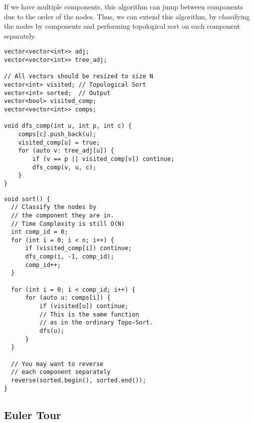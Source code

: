 If we have multiple components, this algorithm can jump
between components due to the order of the nodes. Thus, we can extend this algorithm, 
by classifying the nodes by components and performing topological sort on each component separately.

\begin{center}
\begin{minipage}[t]{0.45\linewidth}
\begin{lstlisting}
vector<vector<int>> adj;
vector<vector<int>> tree_adj;

// All vectors should be resized to size N
vector<int> visited; // Topological Sort
vector<int> sorted;  // Output
vector<bool> visited_comp;
vector<vector<int>> comps;

void dfs_comp(int u, int p, int c) {
    comps[c].push_back(u);
    visited_comp[u] = true;
    for (auto v: tree_adj[u]) {
        if (v == p || visited_comp[v]) continue;
        dfs_comp(v, u, c);
    }
}
\end{lstlisting}
\end{minipage}
\qquad
\begin{minipage}[t]{0.45\linewidth}
\begin{lstlisting}
void sort() {
  // Classify the nodes by
  // the component they are in.
  // Time Complexity is still O(N)
  int comp_id = 0;
  for (int i = 0; i < n; i++) {
      if (visited_comp[i]) continue;
      dfs_comp(i, -1, comp_id);
      comp_id++;
  }

  for (int i = 0; i < comp_id; i++) {
      for (auto u: comps[i]) {
          if (visited[u]) continue;
          // This is the same function
          // as in the ordinary Topo-Sort.
          dfs(u);
      }
  }

  // You may want to reverse
  // each component separately
  reverse(sorted.begin(), sorted.end());
}
\end{lstlisting}
\end{minipage}
\end{center}

\newpage

\subsection{Euler Tour}

